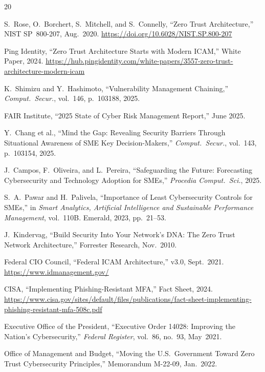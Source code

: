 \documentclass[journal]{IEEEtran}
\begin{document}

\begin{thebibliography}{20}

S.~Rose, O.~Borchert, S.~Mitchell, and S.~Connelly, ``Zero Trust Architecture,''
NIST SP~800-207, Aug.~2020. \url{https://doi.org/10.6028/NIST.SP.800-207}

Ping Identity, ``Zero Trust Architecture Starts with Modern ICAM,'' White Paper, 2024.
\url{https://hub.pingidentity.com/white-papers/3557-zero-trust-architecture-modern-icam}

K.~Shimizu and Y.~Hashimoto, ``Vulnerability Management Chaining,'' \textit{Comput.\
Secur.}, vol.~146, p.~103188, 2025.

FAIR Institute, ``2025 State of Cyber Risk Management Report,'' June 2025.

Y.~Chang et al., ``Mind the Gap: Revealing Security Barriers Through Situational
Awareness of SME Key Decision-Makers,'' \textit{Comput.\ Secur.}, vol.~143, p.~103154,
2025.

J.~Campos, F.~Oliveira, and L.~Pereira, ``Safeguarding the Future: Forecasting
Cybersecurity and Technology Adoption for SMEs,'' \textit{Procedia Comput.\ Sci.}, 2025.

S.~A.~Pawar and H.~Palivela, ``Importance of Least Cybersecurity Controls for SMEs,''
in \textit{Smart Analytics, Artificial Intelligence and Sustainable Performance
Management}, vol.~110B. Emerald, 2023, pp.~21--53.

J.~Kindervag, ``Build Security Into Your Network's DNA: The Zero Trust Network
Architecture,'' Forrester Research, Nov.~2010.

Federal CIO Council, ``Federal ICAM Architecture,'' v3.0, Sept.~2021.
\url{https://www.idmanagement.gov/}

CISA, ``Implementing Phishing-Resistant MFA,'' Fact Sheet, 2024.
\url{https://www.cisa.gov/sites/default/files/publications/fact-sheet-implementing-phishing-resistant-mfa-508c.pdf}

Executive Office of the President, ``Executive Order 14028: Improving the Nation's
Cybersecurity,'' \textit{Federal Register}, vol.~86, no.~93, May~2021.

Office of Management and Budget, ``Moving the U.S.\ Government Toward Zero Trust
Cybersecurity Principles,'' Memorandum M-22-09, Jan.~2022.


\end{thebibliography}
\end{document}
